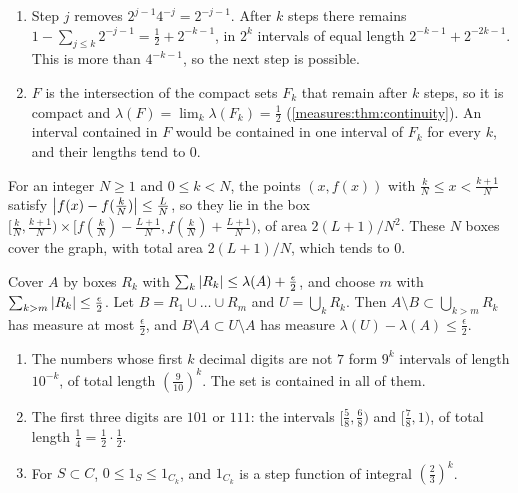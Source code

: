 \begin{enumerate}[nosep]
  \item Step $j$ removes $2^{j-1}4^{-j} = 2^{-j-1}$. After $k$ steps
        there remains
        $1 - \sum_{j\leq k}2^{-j-1} = \frac12 + 2^{-k-1}$, in $2^k$
        intervals of equal length $2^{-k-1} + 2^{-2k-1}$. This is more
        than $4^{-k-1}$, so the next step is possible.
  \item $F$ is the intersection of the compact sets $F_k$ that remain
        after $k$ steps, so it is compact and
        $\lambda(F) = \lim_k\lambda(F_k) = \frac12$
        (\cref{measures:thm:continuity}). An interval contained in $F$
        would be contained in one interval of $F_k$ for every $k$, and
        their lengths tend to $0$.
\end{enumerate}

For an integer $N\geq1$ and $0\leq k < N$, the points $(x, f(x))$ with
$\frac kN\leq x < \frac{k+1}N$ satisfy
$\left|f(x) - f(\frac kN)\right|\leq\frac LN$, so they lie in the box
$[\frac kN, \frac{k+1}N)\times
[f(\frac kN) - \frac{L+1}N, f(\frac kN) + \frac{L+1}N)$, of area
$2(L + 1)/N^2$. These $N$ boxes cover the graph, with total area
$2(L + 1)/N$, which tends to $0$.

Cover $A$ by boxes $R_k$ with
$\sum_k\left|R_k\right|\leq\lambda(A) + \frac\epsilon2$, and choose $m$ with
$\sum_{k>m}\left|R_k\right|\leq\frac\epsilon2$. Let
$B = R_1\cup\dots\cup R_m$ and $U = \bigcup_kR_k$. Then
$A\setminus B\subset\bigcup_{k>m}R_k$ has measure at most
$\frac\epsilon2$, and $B\setminus A\subset U\setminus A$ has measure
$\lambda(U) - \lambda(A)\leq\frac\epsilon2$.

\begin{enumerate}[nosep]
  \item The numbers whose first $k$ decimal digits are not $7$ form
        $9^k$ intervals of length $10^{-k}$, of total length
        $(\frac9{10})^k$. The set is contained in all of them.
  \item The first three digits are $101$ or $111$: the intervals
        $[\frac58, \frac68)$ and $[\frac78, 1)$, of total length
        $\frac14 = \frac12\cdot\frac12$.
  \item For $S\subset C$, $0\leq1_S\leq1_{C_k}$, and $1_{C_k}$ is a
        step function of integral $(\frac23)^k$.
\end{enumerate}

